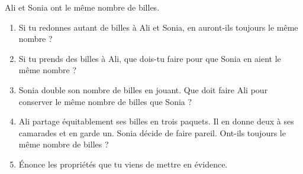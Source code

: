 \begin{activite}
Ali et Sonia ont le même nombre de billes.
\begin{enumerate}
\item Si tu redonnes autant de billes à Ali et Sonia, en auront-ils toujours le même nombre ?
\item Si tu prends des billes à Ali, que dois-tu faire pour que Sonia en aient le même nombre ?
\item Sonia double son nombre de billes en jouant. Que doit faire Ali pour conserver le même nombre de billes que Sonia ?
\item Ali partage équitablement ses billes en trois paquets. Il en donne deux à ses camarades et en garde un. Sonia décide de faire pareil. Ont-ils toujours le même nombre de billes ?
\item Énonce les propriétés que tu viens de mettre en évidence.
\end{enumerate}
\end{activite}
 
 
 
